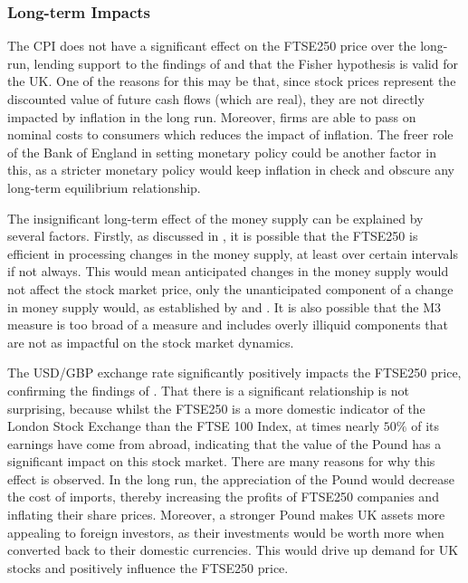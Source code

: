 \documentclass[11pt,a4paper]{article}
\newcommand{\citeboth}[1]{\citeauthor{#1} \citep{#1}}
\begin{document}
\subsubsection{Long-term Impacts}

The CPI does not have a significant effect on the FTSE250 price over the 
long-run, lending support to the findings of 
\citeboth{gultekin1983} and \citeboth{firth1979}
that the Fisher hypothesis is valid for the UK. One of the 
reasons for this may be that, since stock prices represent the 
discounted value of future cash flows (which are real), 
they are not directly impacted by inflation in the long run. Moreover, 
firms are able to pass on nominal costs to consumers which reduces
the impact of inflation.
The freer role of the Bank of England in setting monetary policy could be 
another factor in this, as a stricter monetary policy would keep inflation
in check and obscure any long-term equilibrium relationship. 

The insignificant long-term effect of the money supply can be explained by several factors.
Firstly, as discussed in \citeboth{sellin2001}, it is possible that the FTSE250 is efficient in processing changes in the 
money supply, at least over certain intervals if not always. This would mean anticipated changes in the money supply would not affect the stock market price, only the
unanticipated component of a change in money supply would, as established by \citeboth{sorensen1982} and \citeboth{bernanke2005}. 
It is also possible that the M3 measure is too broad of a measure and includes overly illiquid components that are not as impactful 
on the stock market dynamics. 

The USD/GBP exchange rate significantly positively impacts the FTSE250 price, confirming the findings of 
\citeboth{wong2022}. That there is a significant relationship is not surprising, because whilst the FTSE250 is a more domestic indicator of the London Stock Exchange than the FTSE 100 Index, 
at times nearly $50\%$ of its earnings have come from abroad, indicating that 
the value of the Pound has a significant impact on this stock market. There are many reasons for why this effect is observed.
In the long run, the appreciation of the Pound would decrease the 
cost of imports, thereby increasing the 
profits of FTSE250 companies and inflating their share prices.
Moreover, a stronger Pound makes UK assets more appealing to foreign investors, as their investments would be worth more when converted back to their domestic currencies.
This would drive up demand for UK stocks and positively influence the 
FTSE250 price.
\end{document}
